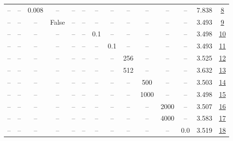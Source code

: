 \begin{table}[H]
\begin{tabular}{cccccccccccccc}
-- & -- & 0.008 & -- & -- & -- & -- & -- & -- & -- & -- & -- & 7.838 & \href{https://wandb.ai/stanford-mercury/optimizer-scaling/runs/sweep-130m-2B-kroncc6d1clr0.008-wd0.7-b10.95-plr0.2-pis1-gn1-nor-5daa90}{8} \\
-- & -- & -- & False & -- & -- & -- & -- & -- & -- & -- & -- & 3.493 & \href{https://wandb.ai/stanford-mercury/optimizer-scaling/runs/sweep-130m-2B-kron15f63alr0.002-wd0.7-b10.95-plr0.2-pis1-gn1-nor-c86fe3}{9} \\
-- & -- & -- & -- & -- & -- & 0.1 & -- & -- & -- & -- & -- & 3.498 & \href{https://wandb.ai/stanford-mercury/optimizer-scaling/runs/sweep-130m-2B-krone65b57lr0.002-wd0.7-b10.95-plr0.1-pis1-gn1-nor-83c7e9}{10} \\
-- & -- & -- & -- & -- & -- & -- & 0.1 & -- & -- & -- & -- & 3.493 & \href{https://wandb.ai/stanford-mercury/optimizer-scaling/runs/sweep-130m-2B-krone7ca20lr0.002-wd0.7-b10.95-plr0.2-pis1-gn1-nor-836663}{11} \\
-- & -- & -- & -- & -- & -- & -- & -- & 256 & -- & -- & -- & 3.525 & \href{https://wandb.ai/stanford-mercury/optimizer-scaling/runs/sweep-130m-2B-kron6a290elr0.002-wd0.7-b10.95-plr0.2-pis1-gn1-nor-00e7d9}{12} \\
-- & -- & -- & -- & -- & -- & -- & -- & 512 & -- & -- & -- & 3.632 & \href{https://wandb.ai/stanford-mercury/optimizer-scaling/runs/sweep-130m-2B-kronbe1c48lr0.002-wd0.7-b10.95-plr0.2-pis1-gn1-nor-6b988f}{13} \\
-- & -- & -- & -- & -- & -- & -- & -- & -- & 500 & -- & -- & 3.503 & \href{https://wandb.ai/stanford-mercury/optimizer-scaling/runs/sweep-130m-2B-kron8b3feelr0.002-wd0.7-b10.95-plr0.2-pis1-gn1-nor-dac9d4}{14} \\
-- & -- & -- & -- & -- & -- & -- & -- & -- & 1000 & -- & -- & 3.498 & \href{https://wandb.ai/stanford-mercury/optimizer-scaling/runs/sweep-130m-2B-kron8264balr0.002-wd0.7-b10.95-plr0.2-pis1-gn1-nor-52689f}{15} \\
-- & -- & -- & -- & -- & -- & -- & -- & -- & -- & 2000 & -- & 3.507 & \href{https://wandb.ai/stanford-mercury/optimizer-scaling/runs/sweep-130m-2B-kron9117dclr0.002-wd0.7-b10.95-plr0.2-pis1-gn1-nor-df1fa7}{16} \\
-- & -- & -- & -- & -- & -- & -- & -- & -- & -- & 4000 & -- & 3.583 & \href{https://wandb.ai/stanford-mercury/optimizer-scaling/runs/sweep-130m-2B-kron1999a2lr0.002-wd0.7-b10.95-plr0.2-pis1-gn1-nor-a2c96d}{17} \\
-- & -- & -- & -- & -- & -- & -- & -- & -- & -- & -- & 0.0 & 3.519 & \href{https://wandb.ai/stanford-mercury/optimizer-scaling/runs/sweep-130m-2B-kron26d3dclr0.002-wd0.0-b10.95-plr0.2-pis1-gn1-nor-978d74}{18} \\

\end{tabular}
\end{table}
